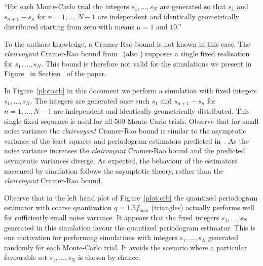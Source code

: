 \documentclass[a4paper,10pt]{article}
\begin{document}
\begin{enumerate}
\begin{enumerate}
``For each Monte-Carlo trial the integers $s_1,\dots,s_N$ are generated so that $s_1$ and $s_{n+1} - s_n$ for $n=1,\dots,N-1$ are independent and identically geometrically distributed starting from zero with means $\mu=1$ and $10$.''
 
To the authors knowledge, a Cramer-Rao bound is not known in this case.   The \emph{clairvoyant} Cramer-Rao bound from~\cite{Sidiropoulos2005} (also \cite{726812,Clarkson2007}) supposes a single fixed realisation for $s_1,\dots,s_N$.  This bound is therefore not valid for the simulations we present in Figure~ in Section~ of the paper.  

In Figure~\ref{plot:crb} in this document we perform a simulation with fixed integers $s_1,\dots,s_N$. The integers are generated once such $s_1$ and $s_{n+1} - s_n$ for $n=1,\dots,N-1$ are independent and identically geometrically distributed.  This single fixed sequence is used for all 500 Monte-Carlo trials.  Observe that for small noise variance the \emph{clairvoyant} Cramer-Rao bound is similar to the asymptotic variance of the least squares and periodogram estimators predicted in~\cite{Quinn_sparse_noisy_SSP_2012,Quinn20013asilomar_period_est}.  As the noise variance increases the \emph{clairvoyant} Cramer-Rao bound and the predicted asymptotic variances diverge.  As expected, the behaviour of the estimators measured by simulation follows the asymptotic theory, rather than the \emph{clairvoyant} Cramer-Rao bound.

Observe that in the left hand plot of Figure~\ref{plot:crb} the quantized periodogram estimator with coarse quantization $q = 1.5 f_{\text{max}}$ (triangles) actually performs well for sufficiently small noise variance.  It appears that the fixed integers $s_1,\dots,s_N$ generated in this simulation favour the quantized periodogram estimator.  This is one motivation for performing simulations with integers $s_1,\dots,s_N$ generated randomly for each Monte-Carlo trial.  It avoids the scenario where a particular favourable set $s_1,\dots,s_N$ is chosen by chance.




\end{enumerate}
\end{enumerate}
\end{document}
